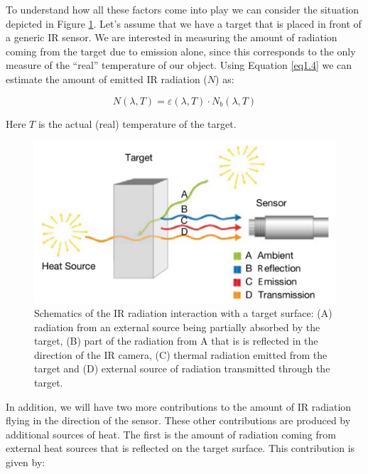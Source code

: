 		To understand how all these factors come into play we can consider the situation depicted in Figure \ref{fig1.6}.  Let's assume that we have a target that is placed in front of a generic IR sensor. We are interested in measuring the amount of radiation coming from the target due to emission alone, since this corresponds to the only measure of the “real” temperature of our object. Using Equation \ref{eq1.4} we can estimate the amount of emitted IR radiation ($N$) as: 
		
		\begin{equation}\label{eq1.8}
			N(\lambda,T)=\varepsilon(\lambda,T) \cdot N_{b}(\lambda, T)
		\end{equation}\bigskip
		
		Here $T$ is the actual (real) temperature of the target.
			
		\begin{figure}[ht!]
			\centering
			\captionsetup{justification=centering,margin=2cm}
			\includegraphics[scale=0.38]{Figures/Chapter01/SchematicsOfIRRadiation.jpg}
			\caption{Schematics of the IR radiation interaction with a target surface: (A) radiation from an external source being partially absorbed by the target, (B) part of the radiation from A that is is reflected in the direction of the IR camera, (C) thermal  radiation emitted from the target and (D) external source of radiation transmitted through the target.}\label{fig1.6}
		\end{figure}
		
		In addition, we will have two more contributions to the amount of IR radiation flying in the direction of the sensor. These other contributions are produced by additional sources of heat. The first is the amount of radiation coming from external heat sources that is reflected on the target surface. This contribution is given by:
		
